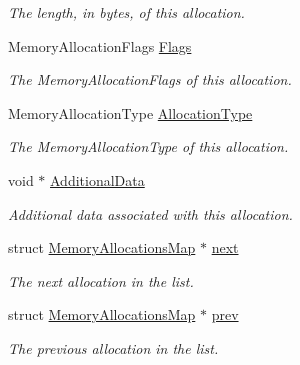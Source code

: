 \begin{DoxyCompactItemize}
\begin{DoxyCompactList}\small\item\em The length, in bytes, of this allocation. \end{DoxyCompactList}\item 
Memory\+Allocation\+Flags \hyperlink{structMemoryAllocationsMap_aa005c0eda018fbc34f205bd26083c214}{Flags}\hypertarget{structMemoryAllocationsMap_aa005c0eda018fbc34f205bd26083c214}{}\label{structMemoryAllocationsMap_aa005c0eda018fbc34f205bd26083c214}

\begin{DoxyCompactList}\small\item\em The Memory\+Allocation\+Flags of this allocation. \end{DoxyCompactList}\item 
Memory\+Allocation\+Type \hyperlink{structMemoryAllocationsMap_a3c85b62354d4a0841f1413f9cfa9bb32}{Allocation\+Type}\hypertarget{structMemoryAllocationsMap_a3c85b62354d4a0841f1413f9cfa9bb32}{}\label{structMemoryAllocationsMap_a3c85b62354d4a0841f1413f9cfa9bb32}

\begin{DoxyCompactList}\small\item\em The Memory\+Allocation\+Type of this allocation. \end{DoxyCompactList}\item 
void $\ast$ \hyperlink{structMemoryAllocationsMap_a68c1daaed62ddc801b0725cc4ee89be9}{Additional\+Data}\hypertarget{structMemoryAllocationsMap_a68c1daaed62ddc801b0725cc4ee89be9}{}\label{structMemoryAllocationsMap_a68c1daaed62ddc801b0725cc4ee89be9}

\begin{DoxyCompactList}\small\item\em Additional data associated with this allocation. \end{DoxyCompactList}\item 
struct \hyperlink{structMemoryAllocationsMap}{Memory\+Allocations\+Map} $\ast$ \hyperlink{structMemoryAllocationsMap_ae3d0fd2e1d38f2035c58deec5066e15b}{next}\hypertarget{structMemoryAllocationsMap_ae3d0fd2e1d38f2035c58deec5066e15b}{}\label{structMemoryAllocationsMap_ae3d0fd2e1d38f2035c58deec5066e15b}

\begin{DoxyCompactList}\small\item\em The next allocation in the list. \end{DoxyCompactList}\item 
struct \hyperlink{structMemoryAllocationsMap}{Memory\+Allocations\+Map} $\ast$ \hyperlink{structMemoryAllocationsMap_a980322a4e7c8fe7fa4937618c9cf2747}{prev}\hypertarget{structMemoryAllocationsMap_a980322a4e7c8fe7fa4937618c9cf2747}{}\label{structMemoryAllocationsMap_a980322a4e7c8fe7fa4937618c9cf2747}

\begin{DoxyCompactList}\small\item\em The previous allocation in the list. \end{DoxyCompactList}\end{DoxyCompactItemize}


